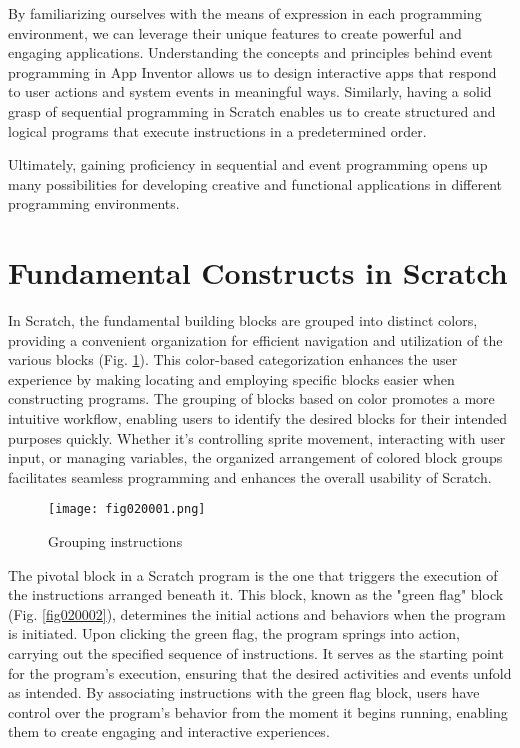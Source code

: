 By familiarizing ourselves with the means of expression in each programming environment, we can leverage their unique features to create powerful and engaging applications. Understanding the concepts and principles behind event programming in App Inventor allows us to design interactive apps that respond to user actions and system events in meaningful ways. Similarly, having a solid grasp of sequential programming in Scratch enables us to create structured and logical programs that execute instructions in a predetermined order.

Ultimately, gaining proficiency in sequential and event programming opens up many possibilities for developing creative and functional applications in different programming environments.

\section{Fundamental Constructs in Scratch}

In Scratch, the fundamental building blocks are grouped into distinct colors, providing a convenient organization for efficient navigation and utilization of the various blocks (Fig. \ref{fig020001}). This color-based categorization enhances the user experience by making locating and employing specific blocks easier when constructing programs. The grouping of blocks based on color promotes a more intuitive workflow, enabling users to identify the desired blocks for their intended purposes quickly. Whether it's controlling sprite movement, interacting with user input, or managing variables, the organized arrangement of colored block groups facilitates seamless programming and enhances the overall usability of Scratch.

\begin{figure}[H]
   \centering
   \texttt{[image: fig020001.png]}
   \caption{Grouping instructions}
\label{fig020001}
\end{figure}

The pivotal block in a Scratch program is the one that triggers the execution of the instructions arranged beneath it. This block, known as the "green flag" block (Fig. \ref{fig020002}), determines the initial actions and behaviors when the program is initiated. Upon clicking the green flag, the program springs into action, carrying out the specified sequence of instructions. It serves as the starting point for the program's execution, ensuring that the desired activities and events unfold as intended. By associating instructions with the green flag block, users have control over the program's behavior from the moment it begins running, enabling them to create engaging and interactive experiences.

